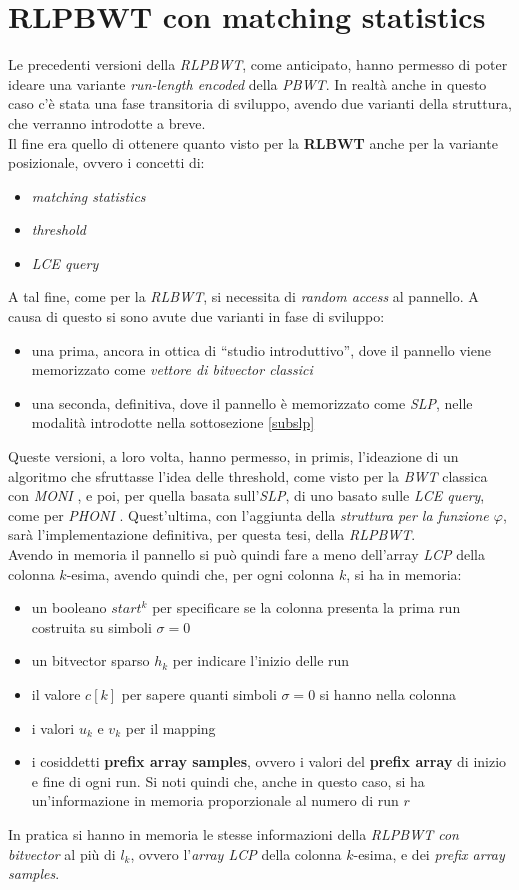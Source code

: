 \section{RLPBWT con matching statistics}
\label{secrlpbwtms}
Le precedenti versioni della \textit{RLPBWT}, come anticipato, hanno permesso di
poter ideare una variante \textit{run-length encoded} della \textit{PBWT}.
In realtà anche in questo caso c'è stata una fase transitoria di sviluppo,
avendo due varianti della struttura, che verranno introdotte a breve.\\
Il fine era quello di ottenere quanto visto per la \textbf{RLBWT} anche per la
variante posizionale, ovvero i concetti di:
\begin{itemize}
  \item \textit{matching statistics}
  \item \textit{threshold}
  \item \textit{LCE query}
\end{itemize}
A tal fine, come per la \textit{RLBWT}, si necessita di \textit{random access}
al pannello. A causa di questo si sono avute due varianti in fase di sviluppo:
\begin{itemize}
  \item una prima, ancora in ottica di ``studio introduttivo'', dove il pannello
  viene memorizzato come \textit{vettore di bitvector classici}
  \item una seconda, definitiva, dove il pannello è memorizzato come
  \textit{SLP}, nelle modalità introdotte nella sottosezione \ref{subslp}
\end{itemize}
Queste versioni, a loro volta, hanno permesso, in primis, l'ideazione di un
algoritmo che sfruttasse l'idea delle threshold, come visto per la \textit{BWT}
classica con \textit{MONI} \cite{moni}, e poi, per quella basata
sull'\textit{SLP}, di uno basato sulle \textit{LCE query}, come per
\textit{PHONI} \cite{phoni}. Quest'ultima, con l'aggiunta della
\textit{struttura per la funzione $\varphi$}, sarà l'implementazione definitiva,
per questa tesi, della \textit{RLPBWT}.\\
Avendo in memoria il pannello si può quindi fare a meno dell'array \textit{LCP}
della colonna $k$-esima, avendo quindi che, per ogni colonna $k$, si ha in
memoria:
\begin{itemize}
  \item un booleano $start^k$ per specificare se la colonna presenta la prima
  run costruita su simboli $\sigma =0$
  \item un bitvector sparso $h_k$ per indicare l'inizio delle run
  \item il valore $c[k]$ per sapere quanti simboli $\sigma=0$ si hanno nella
  colonna 
  \item i valori $u_k$ e $v_k$ per il mapping
  \item i cosiddetti \textbf{prefix array samples}, ovvero i valori del
  \textbf{prefix array} di inizio e fine di ogni run. Si noti quindi che, anche
  in questo caso, si ha un'informazione in memoria proporzionale al numero di
  run $r$ 
\end{itemize}
In pratica si hanno in memoria le stesse informazioni della \textit{RLPBWT con
  bitvector} al più di $l_k$, ovvero l'\textit{array LCP} della colonna
$k$-esima, e dei \textit{prefix array samples}. 
